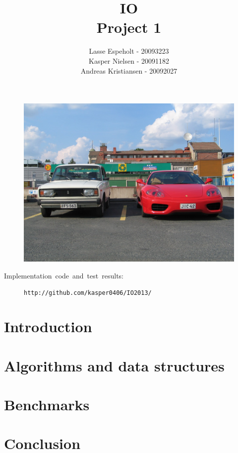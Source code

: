 \documentclass[a4paper,12pt]{article}
\begin{document}
\title{IO\\Project 1}

\author{Lasse Espeholt - 20093223\\
Kasper Nielsen - 20091182\\
Andreas Kristiansen - 20092027\\}

\maketitle
\begin{figure}[h!]
\includegraphics[width=\textwidth]{"images/forside"}
\end{figure}


\vfill{}
\begin{description}
\item [{Implementation~code~and~test~results:}]
\texttt{http://github.com/kasper0406/IO2013/}
\end{description}
\pagebreak{}\tableofcontents{}\pagebreak{}

\section{Introduction}


\section{Algorithms and data structures}

\clearpage{}
\section{Benchmarks}


\section{Conclusion}


\clearpage{}
\end{document}
